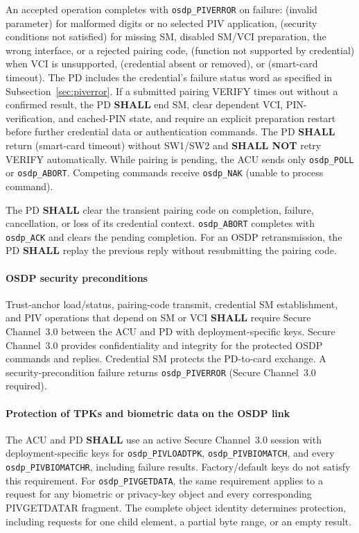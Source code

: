 An accepted operation completes with \texttt{osdp\_PIVERROR} on failure:
 (invalid parameter) for malformed digits or no selected PIV
application,  (security conditions not satisfied) for missing SM,
disabled SM/VCI preparation, the wrong interface, or a rejected pairing code,
 (function not supported by credential) when VCI is unsupported,
 (credential absent or removed), or  (smart-card timeout).
The PD includes the credential's failure status word as specified in
Subsection~\ref{sec:piverror}. If a submitted pairing VERIFY times out without
a confirmed result, the PD \textbf{SHALL} end SM, clear dependent VCI,
PIN-verification, and cached-PIN state, and require an explicit preparation
restart before further credential data or authentication commands.
The PD \textbf{SHALL} return  (smart-card timeout) without SW1/SW2
and \textbf{SHALL NOT} retry VERIFY automatically.
While pairing is pending,
the ACU sends only \texttt{osdp\_POLL} or \texttt{osdp\_ABORT}. Competing commands
receive \texttt{osdp\_NAK}  (unable to process command).

The PD \textbf{SHALL} clear the transient pairing code on completion, failure,
cancellation, or loss of its credential context. \texttt{osdp\_ABORT} completes
with \texttt{osdp\_ACK} and clears the pending completion. For an OSDP
retransmission, the PD \textbf{SHALL} replay the previous reply without
resubmitting the pairing code.

\paragraph{OSDP security preconditions}\label{sec:osdp-security}
Trust-anchor load/status, pairing-code transmit, credential SM establishment,
and PIV operations that depend on SM or VCI \textbf{SHALL} require Secure
Channel~3.0 between the ACU and PD with deployment-specific keys. Secure
Channel~3.0 provides confidentiality and integrity for the protected OSDP commands
and replies. Credential SM protects the PD-to-card exchange. A security-precondition
failure returns \texttt{osdp\_PIVERROR}  (Secure Channel~3.0 required).

\paragraph{Protection of TPKs and biometric data on the OSDP link}
The ACU and PD \textbf{SHALL} use an active Secure Channel~3.0 session with
deployment-specific keys for \texttt{osdp\_PIVLOADTPK},
\texttt{osdp\_PIVBIOMATCH}, and every \texttt{osdp\_PIVBIOMATCHR}, including
failure results. Factory/default keys do not satisfy this requirement.
For \texttt{osdp\_PIVGETDATA}, the same requirement applies to a request for
any biometric or privacy-key object and every corresponding PIVGETDATAR fragment.
The complete object identity determines protection, including requests for one
child element, a partial byte range, or an empty result.

